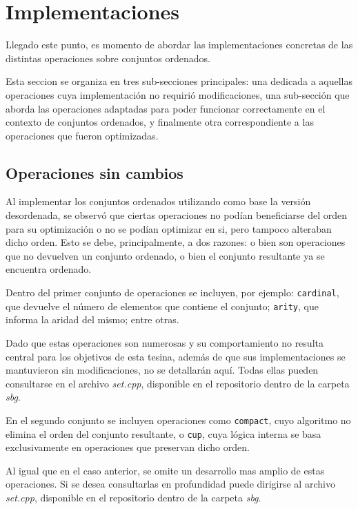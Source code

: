 \section{Implementaciones}

Llegado este punto, es momento de abordar las implementaciones concretas de las distintas operaciones sobre conjuntos ordenados. 

Esta seccion se organiza en tres sub-secciones principales: una dedicada a aquellas operaciones cuya implementación no requirió modificaciones, una sub-sección que aborda las operaciones adaptadas para poder funcionar correctamente en el contexto de conjuntos ordenados, y finalmente otra correspondiente a las operaciones que fueron optimizadas.

\subsection{Operaciones sin cambios}

Al implementar los conjuntos ordenados utilizando como base la versión desordenada, se observó que ciertas operaciones no podían beneficiarse del orden para su optimización o no se podían optimizar en si, pero tampoco alteraban dicho orden. Esto se debe, principalmente, a dos razones: o bien son operaciones que no devuelven un conjunto ordenado, o bien el conjunto resultante ya se encuentra ordenado.

Dentro del primer conjunto de operaciones se incluyen, por ejemplo: \texttt{cardinal}, que devuelve el número de elementos que contiene el conjunto; \texttt{arity}, que informa la aridad del mismo; entre otras.

Dado que estas operaciones son numerosas y su comportamiento no resulta central para los objetivos de esta tesina, además de que sus implementaciones se mantuvieron sin modificaciones, no se detallarán aquí. Todas ellas pueden consultarse en el archivo \textit{set.cpp}, disponible en el repositorio dentro de la carpeta \textit{sbg}.

En el segundo conjunto se incluyen operaciones como \texttt{compact}, cuyo algoritmo no elimina el orden del conjunto resultante, o \texttt{cup}, cuya lógica interna se basa exclusivamente en operaciones que preservan dicho orden.

Al igual que en el caso anterior, se omite un desarrollo mas amplio de estas operaciones. Si se desea consultarlas en profundidad puede dirigirse al archivo \textit{set.cpp}, disponible en el repositorio dentro de la carpeta \textit{sbg}.

